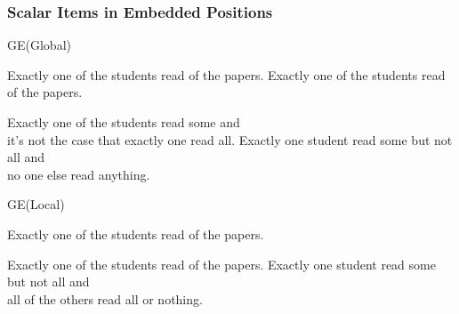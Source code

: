 \documentclass[fleqn,10pt,serif,xcolor=dvipsnames]{beamer}
\newcommand{\GE}{GE\xspace}
\begin{document}

\begin{frame}[shrink=2]
  \frametitle{Scalar Items in Embedded Positions}
  \begin{block}{\GE \hfill (Global)}
    \begin{exe}
       Exactly one of the students read {\color{blue}{some}} of the
      papers.
    \ex Exactly one of the students read {\color{blue}{all}} of the papers.
    \ex
      \begin{xlist}
      \ex Exactly one of the students read some and  \\
        it's not the case that exactly one read all.
      \ex Exactly one student read some but not all and  \\
        no one else read anything.
      \end{xlist}
    \end{exe}
  \end{block}
  \begin{block}{\GE \hfill (Local)}
    \begin{exe}
       Exactly one of the students read {\color{blue}{some}} of the
      papers.
    \ex
      \begin{xlist}
      \ex Exactly one of the students read {\color{blue}{some but not all}} of the papers.
      \ex Exactly one student read some but not all and  \\
        all of the others read all or nothing.
      \end{xlist}
    \end{exe}
  \end{block}
\end{frame}
\end{document}
